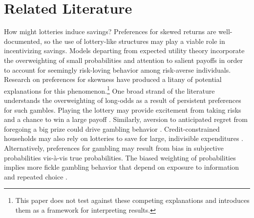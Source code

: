 \documentclass[11pt]{article}
\begin{document}
\section{Related Literature} \label{sec:litreview}

	How might lotteries induce savings? Preferences for skewed returns are well-documented, so the use of lottery-like structures may play a viable role in incentivizing savings. Models departing from expected utility theory incorporate the overweighting of small probabilities  and attention to salient payoffs  in order to account for seemingly risk-loving behavior among risk-averse individuals. Research on preferences for skewness have produced a litany of potential explanations for this phenomenon.\footnote{This paper does not test against these competing explanations and introduces them as a framework for interpreting results.} One broad strand of the literature understands the overweighting of long-odds as a result of persistent preferences for such gambles. Playing the lottery may provide excitement from taking risks and a chance to win a large payoff . Similarly, aversion to anticipated regret from foregoing a big prize could drive gambling behavior . Credit-constrained households may also rely on lotteries to save for large, indivisible expenditures . Alternatively, preferences for gambling may result from bias in subjective probabilities vis-\`{a}-vis true probabilities. The biased weighting of probabilities implies more fickle gambling behavior that depend on exposure to information and repeated choice .

\end{document}
